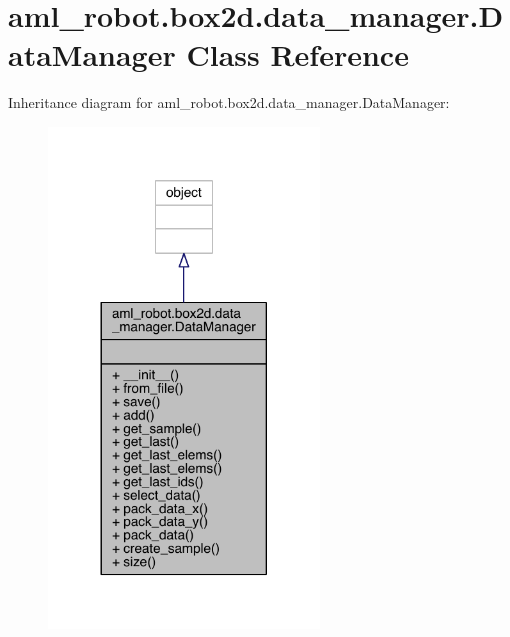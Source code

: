 \hypertarget{classaml__robot_1_1box2d_1_1data__manager_1_1_data_manager}{}\section{aml\+\_\+robot.\+box2d.\+data\+\_\+manager.\+Data\+Manager Class Reference}
\label{classaml__robot_1_1box2d_1_1data__manager_1_1_data_manager}


Inheritance diagram for aml\+\_\+robot.\+box2d.\+data\+\_\+manager.\+Data\+Manager\+:
\nopagebreak
\begin{figure}[H]
\begin{center}
\leavevmode
\includegraphics[width=204pt]{classaml__robot_1_1box2d_1_1data__manager_1_1_data_manager__inherit__graph}
\end{center}
\end{figure}


